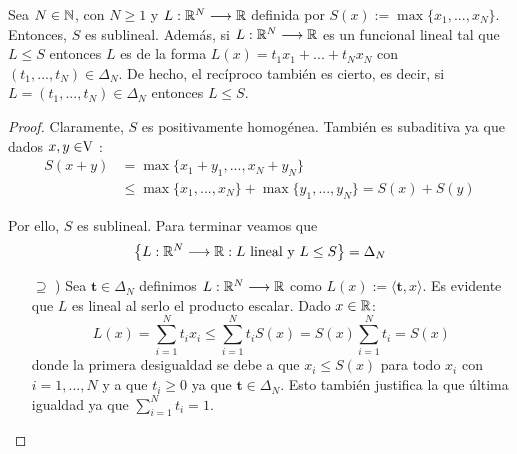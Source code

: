 	\begin{lemaBox}\label{lema2.1}
		Sea $ N \in \mathbb{N} $, con $ N \geq 1 $ y $ L: \mathbb{R}^N \longrightarrow \mathbb{R} $ definida por $ S(x):=\max\{x_1,...,x_N\}$. Entonces, $ S $ es sublineal. Además, si $ L:\mathbb{R}^N \longrightarrow \mathbb{R} $ es un funcional lineal tal que $ L \leq S $ entonces $ L $ es de la forma $ L(x) = t_1 x_1 + ... + t_N x_N $ con $ (t_1,...,t_N) \in \Delta_N$. De hecho, el recíproco también es cierto, es decir, si $ L =  (t_1,...,t_N) \in \Delta_N $ entonces $ L \leq S $.
		
		
	\end{lemaBox}
	\begin{proof}
		Claramente, $ S $ es positivamente homogénea. También es subaditiva ya que dados $ x,y \in \vecSpace $ : 
		\begin{equation*}
		\begin{split}
		S(x+y) &= \max \{x_1 + y_1, ..., x_N +y_N \}\\ 
		&\leq \max\{x_1, ..., x_N\} + \max \{y_1, ...,y_N\} = S(x) + S(y)
		\end{split}
		\end{equation*}
		
		Por ello, $ S $ es sublineal. Para terminar veamos que 
		\begin{equation*}
			\left\lbrace L:\mathbb{R}^N \longrightarrow \mathbb{R} : L \text{ lineal y }L\leq S \right\rbrace = \Delta_N
		\end{equation*}
		
		\begin{itemize}
			\item[$ \supseteq $ )] Sea $ \mathbf{t} \in \Delta_N$ definimos $ L:\mathbb{R}^N \longrightarrow \mathbb{R} $ como $ L(x):= \langle \mathbf{t},x \rangle $. Es evidente que $ L $ es lineal al serlo el producto escalar. Dado $ x \in \mathbb{R} $:
			\begin{equation*}
				L(x) = \sum_{i=1}^{N}{t_i x_i} \leq \sum_{i=1}^{N}{t_i S(x)} = S(x)\sum_{i=1}^{N}{t_i} = S(x)
			\end{equation*}
			donde la primera desigualdad se debe a que $ x_i \leq S(x)$ para todo $ x_i$ con $ i=1,...,N $ y a que $ t_i \geq 0 $ ya que $ \mathbf{t} \in \Delta_N$. Esto también justifica la que última igualdad ya que $ \sum_{i=1}^{N}{t_i} = 1 $.
			

\end{itemize}
\end{proof}

